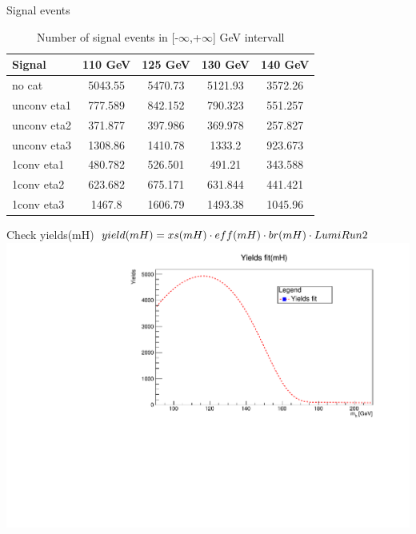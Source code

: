 \documentclass[10pt,UKenglish, leqno, xcolor = dvipsnames]{beamer}
\begin{document}
		\begin{frame}{Signal events}
			\vfill
			\centering
			\begin{table}[tbp]
				\centering
				\begin{tabular}{lcccc}
					\toprule[1.5pt]
					Signal		& 110 GeV	& 125 GeV	& 130 GeV	& 140 GeV	\\
					\midrule
					no cat 		& 5043.55	& 5470.73	& 5121.93	& 3572.26	\\
					unconv eta1 & 777.589	& 842.152	& 790.323	& 551.257	\\
					unconv eta2 & 371.877	& 397.986	& 369.978	& 257.827	\\
					unconv eta3 & 1308.86	& 1410.78	& 1333.2	& 923.673	\\
					1conv eta1 	& 480.782	& 526.501	& 491.21	& 343.588	\\
					1conv eta2 	& 623.682	& 675.171	& 631.844	& 441.421	\\
					1conv eta3	& 1467.8	& 1606.79	& 1493.38	& 1045.96	\\
					\bottomrule[1.5pt]
				\end{tabular}
				\caption{Number of signal events in [-$\infty$,+$\infty$] GeV intervall}
			\end{table}
			\vfill
		\end{frame}
	
		\begin{frame}{Check yields(mH)}
			\vfill
			\centering
			$yield(mH) = x\-s(mH) \cdot eff(mH) \cdot br(mH) \cdot LumiRun2$
			\vspace{.5cm}
			\includegraphics[width=.9\textwidth]{../images/week_10/check_yields.pdf}
			\vfill
		\end{frame}
	
\end{document}
